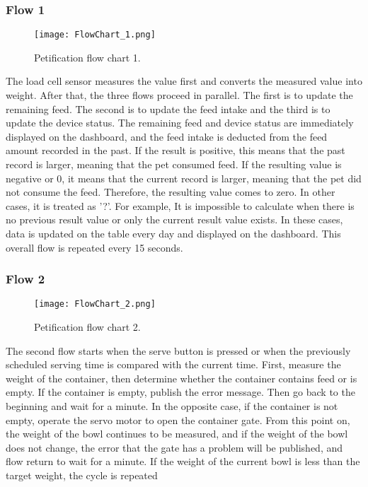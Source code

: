 \documentclass[conference]{IEEEtran}
\begin{document}
\subsubsection{Flow 1}
\begin{figure}[htbp]
\centerline{\texttt{[image: FlowChart\_1.png]}}
\caption{Petification flow chart 1.}
\label{fig}
\end{figure}
The load cell sensor measures the value first and converts the measured value into weight. After that, the three flows proceed in parallel. The first is to update the remaining feed. The second is to update the feed intake and the third is to update the device status.
The remaining feed and device status are immediately displayed on the dashboard, and the feed intake is deducted from the feed amount recorded in the past. If the result is positive, this means that the past record is larger, meaning that the pet consumed feed.
If the resulting value is negative or 0, it means that the current record is larger, meaning that the pet did not consume the feed. Therefore, the resulting value comes to zero. In other cases, it is treated as '?'. For example, It is impossible to calculate when there is no previous result value or only the current result value exists. In these cases, data is updated on the table every day and displayed on the dashboard. This overall flow is repeated every 15 seconds.

\hfill \break
\subsubsection{Flow 2}
\begin{figure}[htbp]
\centerline{\texttt{[image: FlowChart\_2.png]}}
\caption{Petification flow chart 2.}
\label{fig}
\end{figure}
The second flow starts when the serve button is pressed or when the previously scheduled serving time is compared with the current time.
First, measure the weight of the container, then determine whether the container contains feed or is empty. If the container is empty, publish the error message. Then go back to the beginning and wait for a minute.
In the opposite case, if the container is not empty, operate the servo motor to open the container gate. From this point on, the weight of the bowl continues to be measured, and if the weight of the bowl does not change, the error that the gate has a problem will be published, and flow return to wait for a minute.
If the weight of the current bowl is less than the target weight, the cycle is repeated
\end{document}
